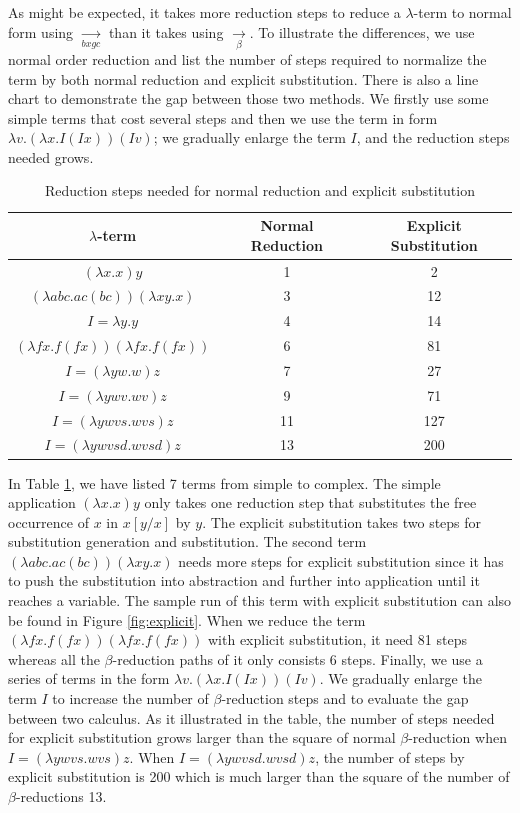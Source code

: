 As might be expected, it takes more reduction steps to reduce a $\lambda$-term to normal form using $\xrightarrow[bxgc]{}$ than it takes using $\xrightarrow[\beta]{}$. To illustrate the differences, we use normal order reduction and list the number of steps required to normalize the term by both normal reduction and explicit substitution. There is also a line chart to demonstrate the gap between those two methods. We firstly use some simple terms that cost several steps and then we use the term in form $\lambda v.(\lambda x.I(Ix))(Iv)$; we gradually enlarge the term $I$, and the reduction steps needed grows.

\begin{table}[ht]
\centering
\begin{tabular}{|c|c|c|}\hline
$\lambda$-term & Normal Reduction & Explicit Substitution\\ \hline
$(\lambda x.x)y$ & 1 & 2\\ \hline
$(\lambda abc.ac(bc))(\lambda xy.x)$ & 3 & 12\\ \hline
$I = \lambda y.y$ & 4 & 14\\ \hline
$(\lambda fx.f(fx))(\lambda fx.f(fx))$ & 6 & 81\\ \hline
$I = (\lambda yw.w)z$ & 7 & 27\\ \hline
$I = (\lambda ywv.wv)z$ & 9 & 71\\ \hline
$I = (\lambda ywvs.wvs)z$ & 11 & 127\\ \hline
$I = (\lambda ywvsd.wvsd)z$ & 13 & 200\\ \hline
\end{tabular}
\caption{Reduction steps needed for normal reduction and explicit substitution}
\label{tb:diff}
\end{table}

In Table \ref{tb:diff}, we have listed 7 terms from simple to complex. The simple application $(\lambda x.x)y$ only takes one reduction step that substitutes the free occurrence of $x$ in $x[y/x]$ by $y$. The explicit substitution takes two steps for substitution generation and substitution. The second term $(\lambda abc.ac(bc))(\lambda xy.x)$ needs more steps for explicit substitution since it has to push the substitution into abstraction and further into application until it reaches a variable. The sample run of this term with explicit substitution can also be found in Figure \ref{fig:explicit}. When we reduce the term $(\lambda fx.f(fx))(\lambda fx.f(fx))$ with explicit substitution, it need 81 steps whereas all the $\beta$-reduction paths of it only consists 6 steps. Finally, we use a series of terms in the form $\lambda v.(\lambda x.I(Ix))(Iv)$. We gradually enlarge the term $I$ to increase the number of $\beta$-reduction steps and to evaluate the gap between two calculus. As it illustrated in the table, the number of steps needed for explicit substitution grows larger than the square of normal $\beta$-reduction when $I = (\lambda ywvs.wvs)z$. When $I = (\lambda ywvsd.wvsd)z$, the number of steps by explicit substitution is 200 which is much larger than the square of the number of $\beta$-reductions 13.

